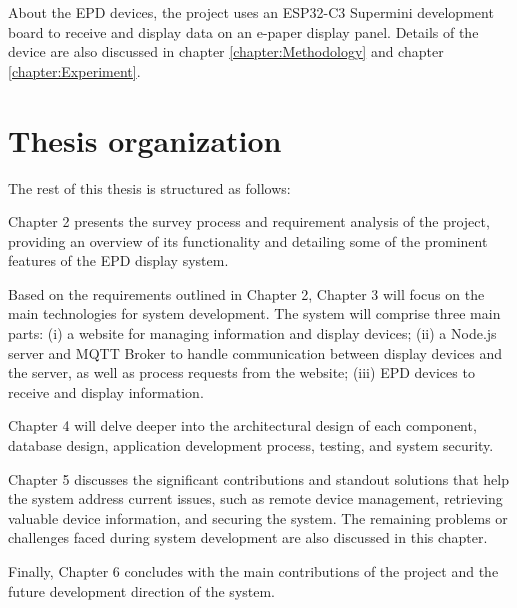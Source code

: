 \documentclass[../Main.tex]{subfiles}
\begin{document}
About the \gls{EPD} devices, the project uses an ESP32-C3 Supermini development board to receive and display data on an e-paper display panel. Details of the device are also discussed in chapter \ref{chapter:Methodology} and chapter \ref{chapter:Experiment}.

\section{Thesis organization}
\label{section:1.4}

The rest of this thesis is structured as follows:

Chapter 2 presents the survey process and requirement analysis of the project, providing an overview of its functionality and detailing some of the prominent features of the \gls{EPD} display system.

Based on the requirements outlined in Chapter 2, Chapter 3 will focus on the main technologies for system development. The system will comprise three main parts: (i) a website for managing information and display devices; (ii) a Node.js server and MQTT Broker to handle communication between display devices and the server, as well as process requests from the website; (iii) \gls{EPD} devices to receive and display information.

Chapter 4 will delve deeper into the architectural design of each component, database design, application development process, testing, and system security.

Chapter 5 discusses the significant contributions and standout solutions that help the system address current issues, such as remote device management, retrieving valuable device information, and securing the system. The remaining problems or challenges faced during system development are also discussed in this chapter.

Finally, Chapter 6 concludes with the main contributions of the project and the future development direction of the system.
\end{document}
